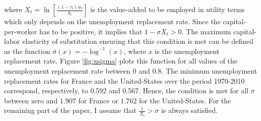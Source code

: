 where $X_t=\ln\left[\frac{(1-\tau_t)w_t}{b_t}\right]$ is the value-added to be employed in utility terms which only depends on the unemployment replacement rate. Since the capital-per-worker has to be positive, it implies that $1-\sigma X_t > 0$. The maximum capital-labor elasticity of substitution ensuring that this condition is met can be defined as the function $\bar{\sigma}(x) = -\log^{-1}(x)$, where $x$ is the unemployment replacement rate. Figure \ref{fig:xsigma} plots this function for all values of the unemployment replacement rate between 0 and 0.8. The minimum unemployment replacement rates for France and the United-States over the period 1970-2010 correspond, respectively, to 0.592 and 0.567. Hence, the condition is met for all $\sigma$ between zero and $1.907$ for France or $1.762$ for the United-States. For the remaining part of the paper, I assume that $\frac{1}{X_t}>\sigma$ is always satisfied.

